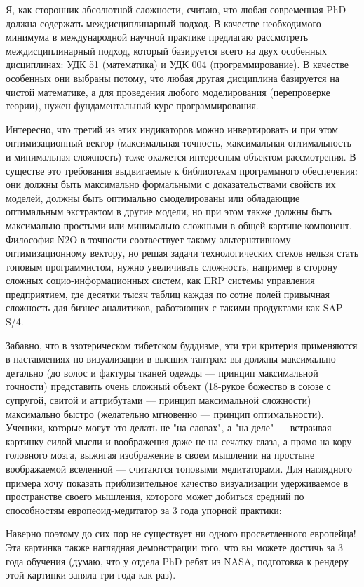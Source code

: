 Я, как сторонник абсолютной сложности, считаю, что любая современная PhD должна содержать междисциплинарный подход. В качестве необходимого минимума в международной научной практике предлагаю рассмотреть междисциплинарный подход, который базируется всего на двух особенных дисциплинах: УДК 51 (математика) и УДК 004 (программирование). В качестве особенных они выбраны потому, что любая другая дисциплина базируется на чистой математике, а для проведения любого моделирования (перепроверке теории), нужен фундаментальный курс программирования.

Интересно, что третий из этих индикаторов можно инвертировать и при этом оптимизационный вектор (максимальная точность, максимальная оптимальность и минимальная сложность) тоже окажется интересным объектом рассмотрения. В существе это требования выдвигаемые к библиотекам программного обеспечения: они должны быть максимально формальными с доказательствами свойств их моделей, должны быть оптимально смоделированы или обладающие оптимальным экстрактом в другие модели, но при этом также должны быть максимально простыми или минимально сложными в общей картине компонент. Философия N2O в точности соотвествует такому альтернативному оптимизационному вектору, но решая задачи технологических стеков нельзя стать топовым программистом, нужно увеличивать сложность, например в сторону сложных социо-информационных систем, как ERP системы управления предприятием, где десятки тысяч таблиц каждая по сотне полей привычная сложность для бизнес аналитиков, работающих с такими продуктами как SAP S/4.

Забавно, что в эзотерическом тибетском буддизме, эти три критерия применяются в наставлениях по визуализации в высших тантрах: вы должны максимально детально (до волос и фактуры тканей одежды — принцип максимальной точности) представить очень сложный объект (18-рукое божество в союзе с супругой, свитой и аттрибутами — принцип максимальной сложности) максимально быстро (желательно мгновенно — принцип оптимальности). Ученики, которые могут это делать не "на словах", а "на деле" — встраивая картинку силой мысли и воображения даже не на сечатку глаза, а прямо на кору головного мозга, выжигая изображение в своем мышлении на простыне воображаемой вселенной — считаются топовыми медитаторами. Для наглядного примера хочу показать приблизительное качество визуализации удерживаемое в пространстве своего мышления, которого может добиться средний по способностям европеоид-медитатор за 3 года упорной практики:

Наверно поэтому до сих пор не существует ни одного просветленного европейца! Эта картинка также наглядная демонстрации того, что вы можете достичь за 3 года обучения (думаю, что у отдела PhD ребят из NASA, подготовка к рендеру этой картинки заняла три года как раз).

\normalsize
